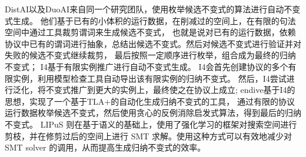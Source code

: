 DistAI\cite{DistAI}以及DuoAI\cite{DuoAI}来自同一个研究团队，使用枚举候选不变式的算法进行自动不变式生成。
他们基于已有的小体积的运行数据，在削减过的空间上，在有限的句法空间中通过工具裁剪谓词来生成候选不变式，
也就是说对已有的运行数据，依赖协议中已有的谓词进行抽象，总结出候选不变式。然后对候选不变式进行验证并对失败的候选不变式继续裁剪，
最后按照一定顺序进行枚举，组合成为最终的归纳不变式；
I4\cite{I4}基于有限实例推广进行自动不变式生成。
I4会首先创建协议的多个有限实例，利用模型检查工具自动导出该有限实例的归纳不变式。
然后，I4尝试进行泛化，将不变式推广到更大的实例上，最终使之在协议上成立;
endive\cite{endive}基于I4的思想，实现了一个基于TLA+的自动化生成归纳不变式的工具，
通过有限的协议运行数据枚举候选不变式，然后使用贪心的反例消除启发式算法，得到最后的归纳不变式。
LIPuS 则在基于语义的基础上，使用了强化学习的框架对搜索空间进行剪枝，并在修剪过后的空间上进行 SMT 求解。使用这种方式可以有效地减少对SMT solver 的调用，从而提高生成归纳不变式的效率。
